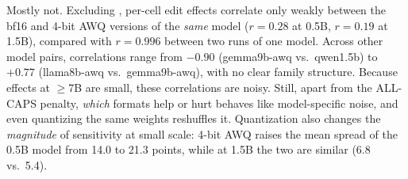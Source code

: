  Mostly not. Excluding \capsedit, per-cell edit effects correlate only weakly between the bf16 and 4-bit AWQ versions of the \emph{same} model ($r=0.28$ at 0.5B, $r=0.19$ at 1.5B), compared with $r=0.996$ between two runs of one model. Across other model pairs, correlations range from $-0.90$ (gemma9b-awq vs.\ qwen1.5b) to $+0.77$ (llama8b-awq vs.\ gemma9b-awq), with no clear family structure. Because effects at $\geq$7B are small, these correlations are noisy. Still, apart from the ALL-CAPS penalty, \emph{which} formats help or hurt behaves like model-specific noise, and even quantizing the same weights reshuffles it. Quantization also changes the \emph{magnitude} of sensitivity at small scale: 4-bit AWQ raises the mean spread of the 0.5B model from 14.0 to 21.3 points, while at 1.5B the two are similar (6.8 vs.\ 5.4).
